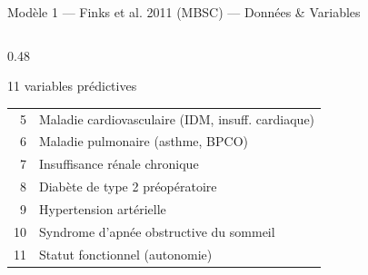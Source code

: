 \documentclass[aspectratio=169]{beamer}
\begin{document}
\begin{frame}[shrink=5]{Modèle 1 --- Finks et al. 2011 (MBSC) --- Données \& Variables}
\begin{columns}[T]
\begin{column}{0.48\textwidth}
\begin{block}{11 variables prédictives}
\begin{tabular}{rl}
          5 & Maladie cardiovasculaire (IDM, insuff. cardiaque) \\
          6 & Maladie pulmonaire (asthme, BPCO) \\
          7 & Insuffisance rénale chronique \\
          8 & Diabète de type 2 préopératoire \\
          9 & Hypertension artérielle \\
          10 & Syndrome d'apnée obstructive du sommeil \\
          11 & Statut fonctionnel (autonomie) \\
          \bottomrule
        \end{tabular}
      \end{block}
    \end{column}
  \end{columns}
\end{frame}
\end{document}
